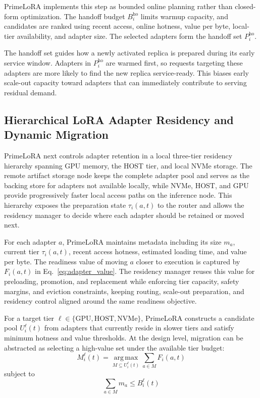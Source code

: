 \documentclass[lettersize,journal]{IEEEtran}
\begin{document}
PrimeLoRA implements this step as bounded online planning rather than closed-form optimization. The handoff budget $B_i^{\mathrm{ho}}$ limits warmup capacity, and candidates are ranked using recent access, online hotness, value per byte, local-tier availability, and adapter size. The selected adapters form the handoff set $P_i^{\mathrm{ho}}$.

The handoff set guides how a newly activated replica is prepared during its early service window. Adapters in $P_i^{\mathrm{ho}}$ are warmed first, so requests targeting these adapters are more likely to find the new replica service-ready. This biases early scale-out capacity toward adapters that can immediately contribute to serving residual demand.

\subsection{Hierarchical LoRA Adapter Residency and Dynamic Migration}

PrimeLoRA next controls adapter retention in a local three-tier residency hierarchy spanning GPU memory, the HOST tier, and local NVMe storage. The remote artifact storage node keeps the complete adapter pool and serves as the backing store for adapters not available locally, while NVMe, HOST, and GPU provide progressively faster local access paths on the inference node. This hierarchy exposes the preparation state $\tau_i(a,t)$ to the router and allows the residency manager to decide where each adapter should be retained or moved next.

For each adapter $a$, PrimeLoRA maintains metadata including its size $m_a$, current tier $\tau_i(a,t)$, recent access hotness, estimated loading time, and value per byte. The readiness value of moving $a$ closer to execution is captured by $F_i(a,t)$ in Eq.~\ref{eq:adapter_value}. The residency manager reuses this value for preloading, promotion, and replacement while enforcing tier capacity, safety margins, and eviction constraints, keeping routing, scale-out preparation, and residency control aligned around the same readiness objective.

For a target tier $\ell \in \{\mathrm{GPU}, \mathrm{HOST}, \mathrm{NVMe}\}$, PrimeLoRA constructs a candidate pool $U_i^{\ell}(t)$ from adapters that currently reside in slower tiers and satisfy minimum hotness and value thresholds. At the design level, migration can be abstracted as selecting a high-value set under the available tier budget:
\begin{equation}
M_i^{\ell}(t)=
\operatorname*{arg\,max}_{M\subseteq U_i^{\ell}(t)}
\sum_{a\in M} F_i(a,t)
\label{eq:residency_selection}
\end{equation}
subject to
\begin{equation}
\sum_{a\in M} m_a \le B_i^{\ell}(t)
\label{eq:residency_budget}
\end{equation}
\end{document}
